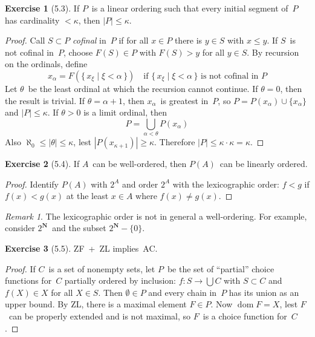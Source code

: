 \documentclass[letterpaper,12pt]{article}
\newcommand{\N}{\boldsymbol{N}}
\newcommand{\union}{\cup}
\newcommand{\bigunion}{\bigcup}
\newcommand{\mult}{\cdot}
\DeclareMathOperator{\dom}{dom}
\newcommand{\card}[1]{|#1|}
\theoremstyle{definition}
\newtheorem*{exer}{Exercise}
\theoremstyle{remark}
\newtheorem*{rmk}{Remark}
\begin{document}
\begin{exer}[5.3]
If \(P\)~is a linear ordering such that every initial segment of~\(P\) has cardinality \(<\kappa\), then \(\card{P}\le\kappa\).
\end{exer}
\begin{proof}
Call \(S\subset P\) \emph{cofinal} in~\(P\) if for all \(x\in P\) there is \(y\in S\) with \(x\le y\). If \(S\)~is not cofinal in~\(P\), choose \(F(S)\in P\) with \(F(S)>y\) for all \(y\in S\). By recursion on the ordinals, define
\[x_{\alpha}=F(\{\,x_{\xi}\mid\xi<\alpha\,\})\quad\text{if }\{\,x_{\xi}\mid\xi<\alpha\,\}\text{ is not cofinal in~\(P\)}\]
Let \(\theta\)~be the least ordinal at which the recursion cannot continue. If \(\theta=0\), then the result is trivial. If \(\theta=\alpha+1\), then \(x_{\alpha}\)~is greatest in~\(P\), so \(P=P(x_{\alpha})\union\{x_{\alpha}\}\) and \(\card{P}\le\kappa\). If \(\theta>0\) is a limit ordinal, then
\[P=\bigunion_{\alpha<\theta}P(x_{\alpha})\]
Also \(\aleph_0\le\card{\theta}\le\kappa\), lest \(\card{P(x_{\kappa+1})}\ge\kappa\). Therefore \(\card{P}\le\kappa\mult\kappa=\kappa\).
\end{proof}

\begin{exer}[5.4]
If \(A\)~can be well-ordered, then \(P(A)\)~can be linearly ordered.
\end{exer}
\begin{proof}
Identify \(P(A)\) with \(2^A\) and order \(2^A\) with the lexicographic order: \(f<g\) if \(f(x)<g(x)\) at the least \(x\in A\) where \(f(x)\ne g(x)\).
\end{proof}
\begin{rmk}
The lexicographic order is not in general a well-ordering. For example, consider \(2^{\N}\)~and the subset \(2^{\N}-\{0\}\).
\end{rmk}

\begin{exer}[5.5]
ZF~+~ZL implies~AC.
\end{exer}
\begin{proof}
If \(C\)~is a set of nonempty sets, let \(P\)~be the set of ``partial'' choice functions for~\(C\) partially ordered by inclusion: \(f:S\to\bigunion C\) with \(S\subset C\) and \(f(X)\in X\) for all \(X\in S\). Then \(\emptyset\in P\) and every chain in~\(P\) has its union as an upper bound. By ZL, there is a maximal element \(F\in P\). Now \(\dom F=X\), lest \(F\)~can be properly extended and is not maximal, so \(F\)~is a choice function for~\(C\).
\end{proof}
\end{document}
